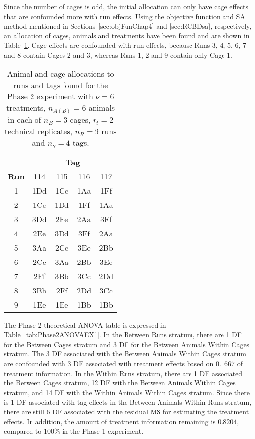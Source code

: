 Since the number of cages is odd, the initial allocation can only have cage effects that are confounded more with run effects. Using the objective function and SA method mentioned in Sections~\ref{sec:objFunChap4} and \ref{sec:RCBDsa}, respectively, an allocation of cages, animals and treatments have been found and are shown in Table~\ref{tab:cagAniDesEX1}. Cage effects are confounded with run effects, because Runs 3, 4, 5, 6, 7 and 8 contain Cages 2 and 3, whereas Runs 1, 2 and 9 contain only Cage 1. 

\begin{table}[ht]                                           
\centering     
\itshape                                               
\caption{Animal and cage allocations to runs and tags found for the Phase 2 experiment with $\nu = 6$ treatments, $n_{A(B)} = 6$ animals in each of  $n_B = 3$ cages, $r_t = 2$ technical replicates, $n_R = 9$ runs and $n_\gamma = 4$ tags.}               
\begin{tabular}{c|cccc}                                     
 & \multicolumn{4}{c}{{\bf Tag}} \\                         
{\bf Run}  & \textnormal{114} & \textnormal{115} & \textnormal{116} & \textnormal{117} \\ 
\hline                                                       
\textnormal{1} & 1Dd & 1Cc & 1Aa & 1Ff \\     
\textnormal{2} & 1Cc & 1Dd & 1Ff & 1Aa \\     
\textnormal{3} & 3Dd & 2Ee & 2Aa & 3Ff \\     
\textnormal{4} & 2Ee & 3Dd & 3Ff & 2Aa \\     
\textnormal{5} & 3Aa & 2Cc & 3Ee & 2Bb \\     
\textnormal{6} & 2Cc & 3Aa & 2Bb & 3Ee \\     
\textnormal{7} & 2Ff & 3Bb & 3Cc & 2Dd \\     
\textnormal{8} & 3Bb & 2Ff & 2Dd & 3Cc \\     
\textnormal{9} & 1Ee & 1Ee & 1Bb & 1Bb \\                                       
\end{tabular}                                               
\label{tab:cagAniDesEX1}                                      
\end{table} 
     
The Phase 2 theoretical ANOVA table is expressed in Table~\ref{tab:Phase2ANOVAEX1}. In the Between Runs stratum, there are 1 DF for the Between Cages stratum and 3 DF for the Between Animals Within Cages stratum. The 3 DF associated with the Between Animals Within Cages stratum are confounded with 3 DF associated with treatment effects based on $0.1667$ of treatment information. In the Within Runs stratum, there are 1 DF associated the Between Cages stratum, 12 DF with the Between Animals Within Cages stratum, and 14 DF with the Within Animals Within Cages stratum. Since there is 1 DF associated with tag effects in the Between Animals Within Runs stratum, there are still 6 DF associated with the residual MS for estimating the treatment effects. In addition, the amount of treatment information remaining is $0.8204$, compared to $100\%$ in the Phase 1 experiment.

